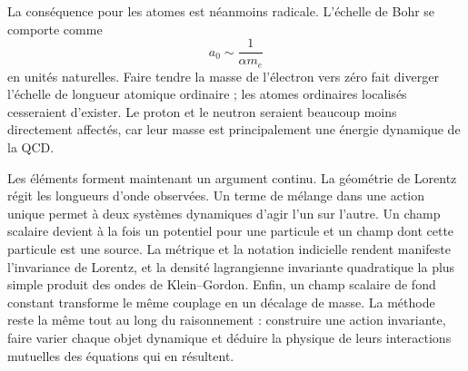 \begin{classroomqa}
\end{classroomqa}

La conséquence pour les atomes est néanmoins radicale. L’échelle de Bohr se comporte comme
\begin{equation}
a_0\sim\frac{1}{\alpha m_e}
\end{equation}
en unités naturelles. Faire tendre la masse de l’électron vers zéro fait diverger l’échelle de longueur atomique ordinaire ; les atomes ordinaires localisés cesseraient d’exister. Le proton et le neutron seraient beaucoup moins directement affectés, car leur masse est principalement une énergie dynamique de la QCD.

Les éléments forment maintenant un argument continu. La géométrie de Lorentz régit les longueurs d’onde observées. Un terme de mélange dans une action unique permet à deux systèmes dynamiques d’agir l’un sur l’autre. Un champ scalaire devient à la fois un potentiel pour une particule et un champ dont cette particule est une source. La métrique et la notation indicielle rendent manifeste l’invariance de Lorentz, et la densité lagrangienne invariante quadratique la plus simple produit des ondes de Klein--Gordon. Enfin, un champ scalaire de fond constant transforme le même couplage en un décalage de masse. La méthode reste la même tout au long du raisonnement : construire une action invariante, faire varier chaque objet dynamique et déduire la physique de leurs interactions mutuelles des équations qui en résultent.